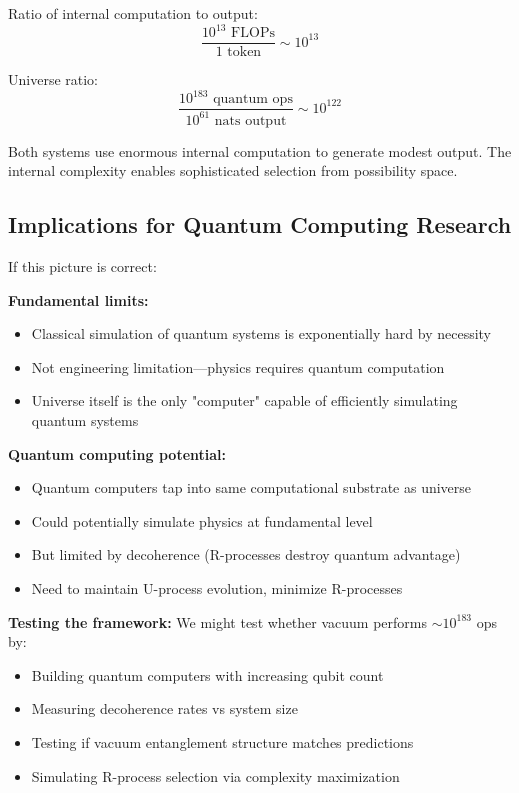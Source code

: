 ﻿\documentclass{article}
\begin{document}
Ratio of internal computation to output:
\begin{equation}
\frac{10^{13} \text{ FLOPs}}{1 \text{ token}} \sim 10^{13}
\end{equation}


Universe ratio:
\begin{equation}
\frac{10^{183} \text{ quantum ops}}{10^{61} \text{ nats output}} \sim 10^{122}
\end{equation}


Both systems use enormous internal computation to generate modest output. The internal complexity enables sophisticated selection from possibility space.


\subsection{Implications for Quantum Computing Research}


If this picture is correct:


\textbf{Fundamental limits:}
\begin{itemize}
\item Classical simulation of quantum systems is exponentially hard by necessity
\item Not engineering limitation—physics requires quantum computation
\item Universe itself is the only "computer" capable of efficiently simulating quantum systems
\end{itemize}


\textbf{Quantum computing potential:}
\begin{itemize}
\item Quantum computers tap into same computational substrate as universe
\item Could potentially simulate physics at fundamental level
\item But limited by decoherence (R-processes destroy quantum advantage)
\item Need to maintain U-process evolution, minimize R-processes
\end{itemize}


\textbf{Testing the framework:}
We might test whether vacuum performs $\sim 10^{183}$ ops by:
\begin{itemize}
\item Building quantum computers with increasing qubit count
\item Measuring decoherence rates vs system size
\item Testing if vacuum entanglement structure matches predictions
\item Simulating R-process selection via complexity maximization
\end{itemize}
\end{document}
